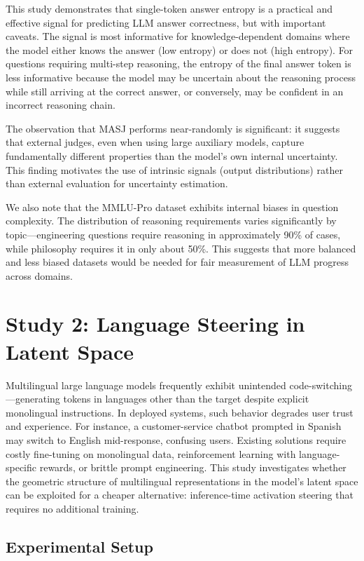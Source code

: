 This study demonstrates that single-token answer entropy is a practical and effective signal for predicting LLM answer correctness, but with important caveats. The signal is most informative for knowledge-dependent domains where the model either knows the answer (low entropy) or does not (high entropy). For questions requiring multi-step reasoning, the entropy of the final answer token is less informative because the model may be uncertain about the reasoning process while still arriving at the correct answer, or conversely, may be confident in an incorrect reasoning chain.

The observation that MASJ performs near-randomly is significant: it suggests that external judges, even when using large auxiliary models, capture fundamentally different properties than the model's own internal uncertainty. This finding motivates the use of intrinsic signals (output distributions) rather than external evaluation for uncertainty estimation.

We also note that the MMLU-Pro dataset exhibits internal biases in question complexity. The distribution of reasoning requirements varies significantly by topic---engineering questions require reasoning in approximately 90\% of cases, while philosophy requires it in only about 50\%. This suggests that more balanced and less biased datasets would be needed for fair measurement of LLM progress across domains.

\section{Study 2: Language Steering in Latent Space}

Multilingual large language models frequently exhibit unintended code-switching---generating tokens in languages other than the target despite explicit monolingual instructions. In deployed systems, such behavior degrades user trust and experience. For instance, a customer-service chatbot prompted in Spanish may switch to English mid-response, confusing users. Existing solutions require costly fine-tuning on monolingual data, reinforcement learning with language-specific rewards, or brittle prompt engineering. This study investigates whether the geometric structure of multilingual representations in the model's latent space can be exploited for a cheaper alternative: inference-time activation steering that requires no additional training.

\subsection{Experimental Setup}

